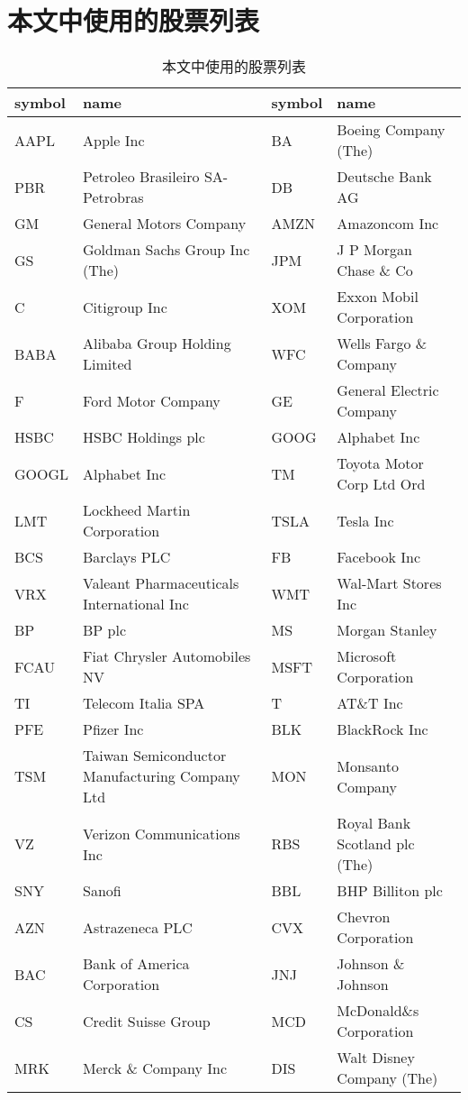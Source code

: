 \chapter{本文中使用的股票列表}
\label{cha:stock-list}


\begin{table}[ht]
	\centering 
	\caption{本文中使用的股票列表}
	\label{tab:stock-list}
	\begin{tabular}{|l|m{5cm}|l|m{5cm}|}
		\hline 
		symbol & name & symbol & name\\ 
		\hline 
		AAPL & Apple Inc & BA & Boeing Company (The) \\
		PBR & Petroleo Brasileiro SA- Petrobras & DB & Deutsche Bank AG \\
		GM & General Motors Company & AMZN & Amazoncom Inc \\
		GS & Goldman Sachs Group Inc (The) & JPM & J P Morgan Chase \& Co \\
		C & Citigroup Inc & XOM & Exxon Mobil Corporation \\
		BABA & Alibaba Group Holding Limited & WFC & Wells Fargo \& Company \\
		F & Ford Motor Company & GE & General Electric Company \\
		HSBC & HSBC Holdings plc & GOOG & Alphabet Inc \\
		GOOGL & Alphabet Inc & TM & Toyota Motor Corp Ltd Ord \\
		LMT & Lockheed Martin Corporation & TSLA & Tesla Inc  \\
		BCS & Barclays PLC & FB & Facebook Inc \\
		VRX & Valeant Pharmaceuticals International Inc & WMT & Wal-Mart Stores Inc \\
		BP & BP plc & MS & Morgan Stanley \\
		FCAU & Fiat Chrysler Automobiles NV & MSFT & Microsoft Corporation \\
		TI & Telecom Italia SPA & T & AT\&T Inc \\
		PFE & Pfizer Inc & BLK & BlackRock Inc \\
		TSM & Taiwan Semiconductor Manufacturing Company Ltd & MON & Monsanto Company \\
		VZ & Verizon Communications Inc & RBS & Royal Bank Scotland plc (The) \\
		SNY & Sanofi & BBL & BHP Billiton plc \\
		AZN & Astrazeneca PLC & CVX & Chevron Corporation \\
		BAC & Bank of America Corporation & JNJ & Johnson \& Johnson \\
		CS & Credit Suisse Group & MCD & McDonald\&s Corporation \\
		MRK & Merck \& Company Inc & DIS & Walt Disney Company (The) \\
		\hline 
	\end{tabular}
\end{table}
